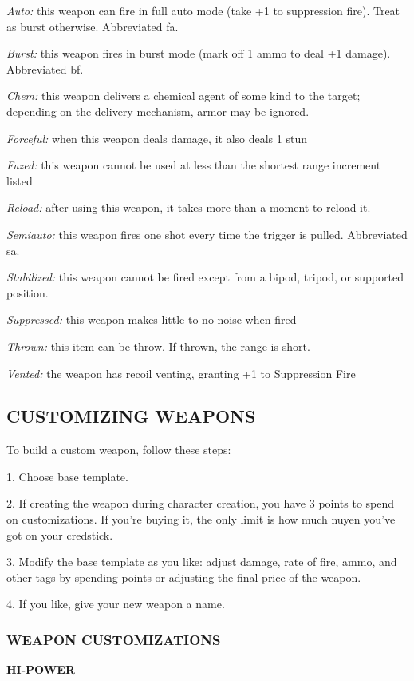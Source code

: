 \documentclass[oneside,10pt]{article}
\begin{document}
\begin{multicols}{2}
\begin{adjustwidth*}{.5cm}{.5cm}
\textit{Auto:} this weapon can fire in full auto mode (take +1 to
suppression fire). Treat as burst otherwise. Abbreviated fa.

\textit{Burst:} this weapon fires in burst mode (mark off 1 ammo to
deal +1 damage). Abbreviated bf.

\textit{Chem:} this weapon delivers a chemical agent of some kind
to the target; depending on the delivery mechanism, armor may be ignored.

\textit{Forceful:} when this weapon deals damage, it also deals 1
stun

\textit{Fuzed:} this weapon cannot be used at less than the shortest range increment listed

\textit{Reload:} after using this weapon, it takes more than a moment to reload it.

\textit{Semiauto:} this weapon fires one shot every time the trigger is pulled. Abbreviated sa.

\textit{Stabilized:} this weapon cannot be fired except from a bipod, tripod, or supported position.

\textit{Suppressed:} this weapon makes little to no noise when
fired

\textit{Thrown:} this item can be throw. If thrown, the range is
short.

\textit{Vented:} the weapon has recoil venting, granting +1 to
Suppression Fire
\end{adjustwidth*}

\subsection{CUSTOMIZING WEAPONS}
To build a custom weapon, follow these steps:

\begin{adjustwidth*}{.5cm}{.5cm}
1.	Choose base template.

2.	If creating the weapon during character creation, you
have 3 points to spend on customizations. If you’re buying it, the only limit is how much nuyen you’ve got on
your credstick.

3.	Modify the base template as you like: adjust damage,
rate of fire, ammo, and other tags by spending points or
adjusting the final price of the weapon.

4.	If you like, give your new weapon a name.
\end{adjustwidth*}

\subsubsection{WEAPON CUSTOMIZATIONS}
\textbf{HI-POWER}


\end{multicols}
\end{document}
